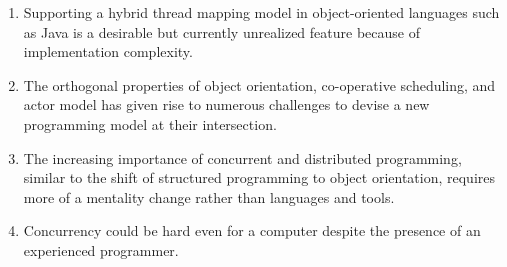 \documentclass[a5paper,10pt]{article}
\begin{document}
\begin{enumerate}
\item Supporting a hybrid thread mapping model in object-oriented languages
such as Java is a desirable but currently unrealized feature because of implementation
complexity.

\item The orthogonal properties of object orientation, co-operative scheduling,
and actor model has given rise to numerous challenges to devise a new 
programming model at their intersection.

\item The increasing importance of concurrent and distributed programming,
similar to the shift of structured programming to object orientation,
requires more of a mentality change rather than languages and tools.

\item Concurrency could be hard even for a computer despite the presence of an 
experienced programmer.
\end{enumerate} 
 
\end{document}
